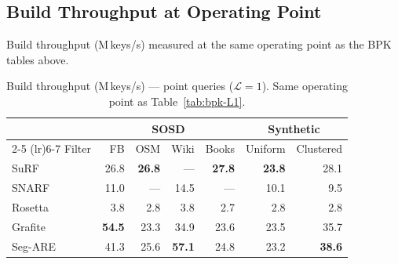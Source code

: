 \subsection{Build Throughput at Operating Point}
\label{subsec:eval-throughput}

Build throughput (M\,keys/s) measured at the same operating point as the BPK tables above.

\begin{table}[H]
    \centering
    \small
    \begin{tabular}{@{}lrrrrrr@{}}
        \toprule
        & \multicolumn{4}{c}{SOSD} & \multicolumn{2}{c}{Synthetic} \\
        \cmidrule(lr){2-5} \cmidrule(lr){6-7}
        Filter & FB & OSM & Wiki & Books & Uniform & Clustered \\
        \midrule
        SuRF    & 26.8 & \textbf{26.8}         & \textnormal{---} & \textbf{27.8} & \textbf{23.8} & 28.1 \\
        SNARF   & 11.0 & \textnormal{---}       & 14.5             & \textnormal{---} & 10.1 & 9.5  \\
        Rosetta & 3.8  & 2.8                   & 3.8              & 2.7  & 2.8  & 2.8  \\
        Grafite & \textbf{54.5} & 23.3         & 34.9             & 23.6 & 23.5 & 35.7 \\
        Seg-ARE & 41.3 & 25.6                  & \textbf{57.1}    & 24.8 & 23.2 & \textbf{38.6} \\
        \bottomrule
    \end{tabular}
    \caption{Build throughput (M\,keys/s) --- point queries ($\mathcal{L}=1$).
             Same operating point as Table~\ref{tab:bpk-L1}.}
    \label{tab:throughput-L1}
\end{table}

